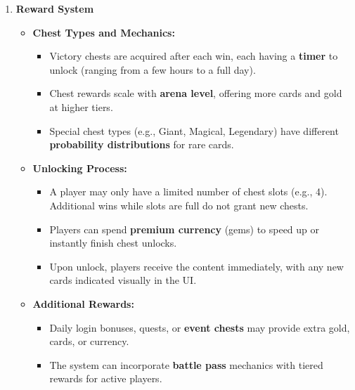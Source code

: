 \documentclass{article}
\begin{document}
\begin{enumerate}[label=\textbf{FR\arabic*.}]
\item \textbf{Reward System}
\begin{itemize}
    \item \textbf{Chest Types and Mechanics:}
    \begin{itemize}
        \item Victory chests are acquired after each win, each having a \textbf{timer} to unlock (ranging from a few hours to a full day).
        \item Chest rewards scale with \textbf{arena level}, offering more cards and gold at higher tiers.
        \item Special chest types (e.g., Giant, Magical, Legendary) have different \textbf{probability distributions} for rare cards.
    \end{itemize}
    \item \textbf{Unlocking Process:}
    \begin{itemize}
        \item A player may only have a limited number of chest slots (e.g., 4). Additional wins while slots are full do not grant new chests.
        \item Players can spend \textbf{premium currency} (gems) to speed up or instantly finish chest unlocks.
        \item Upon unlock, players receive the content immediately, with any new cards indicated visually in the UI.
    \end{itemize}
    \item \textbf{Additional Rewards:}
    \begin{itemize}
        \item Daily login bonuses, quests, or \textbf{event chests} may provide extra gold, cards, or currency.
        \item The system can incorporate \textbf{battle pass} mechanics with tiered rewards for active players.
    \end{itemize}
\end{itemize}


\end{enumerate}
\end{document}
